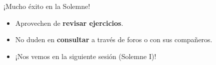 \documentclass[10pt]{beamer}
\begin{document}
\begin{frame}
  \Huge{\centerline{¡Mucho éxito en la Solemne!}}
  \vspace{0.4cm}
  \normalsize
  \begin{itemize}
    \item Aprovechen de \textbf{revisar ejercicios}.
    \item No duden en \textbf{consultar} a través de foros o con sus compañeros.
    \item ¡Nos vemos en la siguiente sesión (Solemne I)!
  \end{itemize}
\end{frame}
\end{document}
